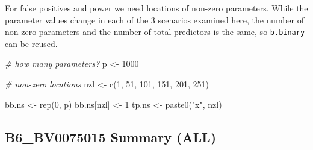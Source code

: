 \documentclass[
]{article}
\newenvironment{Shaded}{\begin{snugshade}}{\end{snugshade}}
\newcommand{\CommentTok}[1]{\textcolor[rgb]{0.56,0.35,0.01}{\textit{#1}}}
\newcommand{\DecValTok}[1]{\textcolor[rgb]{0.00,0.00,0.81}{#1}}
\newcommand{\FunctionTok}[1]{\textcolor[rgb]{0.00,0.00,0.00}{#1}}
\newcommand{\NormalTok}[1]{#1}
\newcommand{\OtherTok}[1]{\textcolor[rgb]{0.56,0.35,0.01}{#1}}
\newcommand{\StringTok}[1]{\textcolor[rgb]{0.31,0.60,0.02}{#1}}
\begin{document}
For false positives and power we need locations of non-zero parameters.
While the parameter values change in each of the 3 scenarios examined
here, the number of non-zero parameters and the number of total
predictors is the same, so \texttt{b.binary} can be reused.

\begin{Shaded}
\begin{Highlighting}[]
\CommentTok{\# how many parameters?}
\NormalTok{p }\OtherTok{\textless{}{-}} \DecValTok{1000}

\CommentTok{\# non{-}zero locations}
\NormalTok{nzl }\OtherTok{\textless{}{-}} \FunctionTok{c}\NormalTok{(}\DecValTok{1}\NormalTok{, }\DecValTok{51}\NormalTok{, }\DecValTok{101}\NormalTok{, }\DecValTok{151}\NormalTok{, }\DecValTok{201}\NormalTok{, }\DecValTok{251}\NormalTok{)}

\NormalTok{bb.ns }\OtherTok{\textless{}{-}} \FunctionTok{rep}\NormalTok{(}\DecValTok{0}\NormalTok{, p)}
\NormalTok{bb.ns[nzl] }\OtherTok{\textless{}{-}} \DecValTok{1}
\NormalTok{tp.ns }\OtherTok{\textless{}{-}} \FunctionTok{paste0}\NormalTok{(}\StringTok{"x"}\NormalTok{, nzl)}
\end{Highlighting}
\end{Shaded}

\hypertarget{b6_bv0075015-summary-all}{%
\subsection{B6\_BV0075015 Summary
(ALL)}\label{b6_bv0075015-summary-all}}
\end{document}
